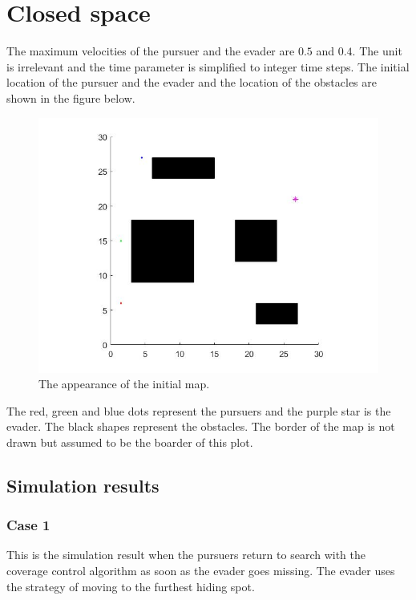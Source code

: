 \documentclass[ebook,11pt] {kth-mag}
\begin{document}
\section{Closed space}
The maximum velocities of the pursuer and the evader are $0.5$ and $0.4$. The unit is irrelevant and the time parameter is simplified to integer time steps. The initial location of the pursuer and the evader and the location of the obstacles are shown in the figure below. 

\begin{figure}[H]
\includegraphics[scale=0.4]{obstacles}
\centering
\caption{The appearance of the initial map.}
\end{figure}

The red, green and blue dots represent the pursuers and the purple star is the evader. The black shapes represent the obstacles. The border of the map is not drawn but assumed to be the boarder of this plot. 

\subsection{Simulation results}


\subsubsection{Case 1}
This is the simulation result when the pursuers return to search with the coverage control algorithm as soon as the evader goes missing. The evader uses the strategy of moving to the furthest hiding spot. 
\end{document}

